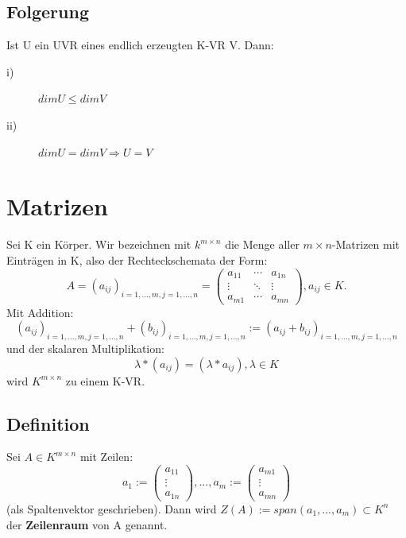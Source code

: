 \documentclass{scrbook}
\begin{document}
\section{Folgerung}
Ist U ein UVR eines endlich erzeugten K-VR V. Dann:\begin{description}
\item[i)]$dimU\leq dimV$
\item[ii)]$dimU=dimV\Rightarrow U=V$
\end{description}
\chapter{Matrizen}
Sei K ein Körper. Wir bezeichnen mit $k^{m\times n}$ die Menge aller $m \times n$-Matrizen mit Einträgen in K, also der Rechteckschemata der Form:\[
A=(a_{ij})_{i=1,...,m,j=1,...,n}=
\left(
\begin{array}{ccc}
a_{11}&\cdots&a_{1n}\\
\vdots&\ddots&\vdots\\
a_{m1}&\cdots&a_{mn}
\end{array}
\right)
,a_{ij}\in K.
\]
Mit  Addition:
\[
(a_{ij})_{i=1,...,m,j=1,...,n}+(b_{ij})_{i=1,...,m,j=1,...,n}:=(a_{ij}+b_{ij})_{i=1,...,m,j=1,...,n}
\]
und der skalaren Multiplikation:
\[
\lambda*(a_{ij})=(\lambda*a_{ij}), \lambda\in K
\]
wird $K^{m\times n}$ zu einem K-VR.
\section{Definition}
Sei $A \in K^{m \times n}$ mit Zeilen:\[
a_1:=
\left(
\begin{array}{c}
a_{11}\\\vdots\\a_{1n}
\end{array}
\right)
,...,
a_m:=
\left(
\begin{array}{c}
a_{m1}\\\vdots\\a_{mn}
\end{array}
\right)
\]
(als Spaltenvektor geschrieben). Dann wird $Z(A) := span(a_1,...,a_m) \subset K^n$ der \textbf{Zeilenraum} von A genannt.
\end{document}

